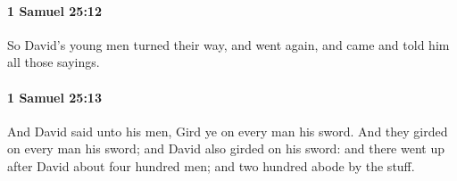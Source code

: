 		\paragraph{1 Samuel 25:12} %
			\label{1SAMUEL-25-12}

			So David’s young men turned their way, and went again, and came and told him all those sayings.


		\paragraph{1 Samuel 25:13} %
			\label{1SAMUEL-25-13}

			And David said unto his men, Gird ye on every man his sword. And they girded on every man his sword; and David also girded on his sword: and there went up after David about four hundred men; and two hundred abode by the stuff.


